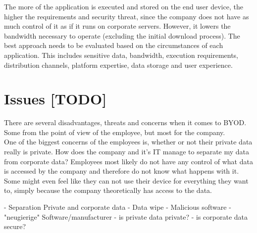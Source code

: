 The more of the application is executed and stored on the end user device, the higher the requirements and security threat, since the company does not have as much control of it as if it runs on corporate servers.  However, it lowers the bandwidth necessary to operate (excluding the initial download process). The best approach needs to be evaluated based on the circumstances of each application. This includes sensitive data, bandwidth, execution requirements, distribution channels, platform expertise, data storage and user experience. \parencite{Disterer.2013}

\section{Issues [TODO]}
There are several disadvantages, threats and concerns when it comes to BYOD. Some from the point of view of the employee, but most for the company. \\


One of the biggest concerns of the employees is, whether or not their private data really is private. How does the company and it's IT manage to separate my data from corporate data? Employees most likely do not have any control of what data is accessed by the company and therefore do not know what happens with it. Some might even feel like they can not use their device for everything they want to, simply because the company theoretically has access to the data.


- Separation Private and corporate data
- Data wipe
- Malicious software
- "neugierige" Software/manufacturer
- is private data private?
- is corporate data secure?
